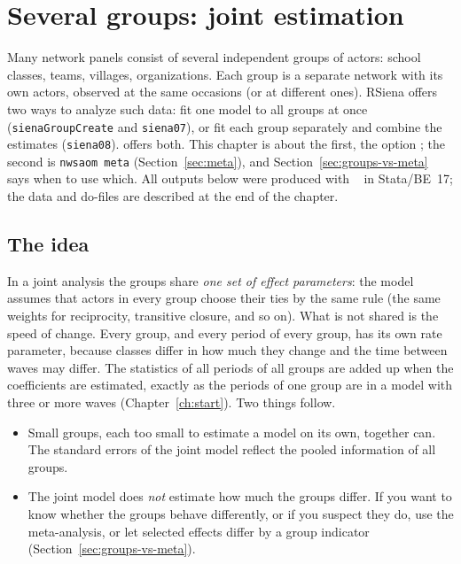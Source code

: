 \chapter{Several groups: joint estimation}\label{ch:groups}

Many network panels consist of several independent groups of actors: school classes, teams, villages, organizations. Each group is a separate network with its own actors, observed at the same occasions (or at different ones). RSiena offers two ways to analyze such data: fit one model to all groups at once (\texttt{sienaGroupCreate} and \texttt{siena07}), or fit each group separately and combine the estimates (\texttt{siena08}). \nwsaom{} offers both. This chapter is about the first, the option ; the second is \texttt{nwsaom meta} (Section~\ref{sec:meta}), and Section~\ref{sec:groups-vs-meta} says when to use which. All outputs below were produced with \nwsaom{}~\pkgversion{} in Stata/BE~17; the data and do-files are described at the end of the chapter.

\section{The idea}\label{sec:groups-idea}

In a joint analysis the groups share \emph{one set of effect parameters}: the model assumes that actors in every group choose their ties by the same rule (the same weights for reciprocity, transitive closure, and so on). What is not shared is the speed of change. Every group, and every period of every group, has its own rate parameter, because classes differ in how much they change and the time between waves may differ. The statistics of all periods of all groups are added up when the coefficients are estimated, exactly as the periods of one group are in a model with three or more waves (Chapter~\ref{ch:start}). Two things follow.

\begin{itemize}[nosep]
  \item Small groups, each too small to estimate a model on its own, together can. The standard errors of the joint model reflect the pooled information of all groups.
  \item The joint model does \emph{not} estimate how much the groups differ. If you want to know whether the groups behave differently, or if you suspect they do, use the meta-analysis, or let selected effects differ by a group indicator (Section~\ref{sec:groups-vs-meta}).
\end{itemize}

